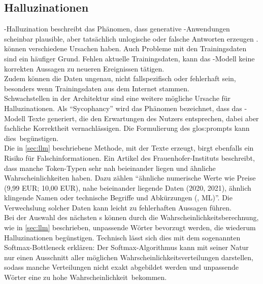 \documentclass[../main.tex]{subfiles}
\begin{document}
\subsection{Halluzinationen}
 -Halluzination beschreibt 
das Phänomen, dass generative -Anwendungen scheinbar plausible, aber tatsächlich unlogische oder falsche Antworten erzeugen \cite{hallucinationForewarning}.\\
 können verschiedene Ursachen haben. Auch Probleme mit den Trainingsdaten sind ein häufiger Grund. Fehlen aktuelle Trainingsdaten, kann das -Modell keine korrekten Aussagen zu neueren Ereignissen tätigen.\\ 
Zudem können die Daten ungenau, nicht fallspezifisch oder fehlerhaft sein, besonders wenn Trainingsdaten aus dem Internet stammen.\\ 
Schwachstellen in der Architektur sind eine weitere mögliche Ursache für Halluzinationen. Als "`Sycophancy"' wird das Phänomen bezeichnet, dass das -Modell Texte 
generiert, die den Erwartungen des Nutzers entsprechen, dabei aber fachliche Korrektheit vernachlässigen. Die Formulierung des \gls{glos:prompt}s kann \mbox{dies begünstigen. \cite{allgemHalluzinationen}} \\
Die in \autoref{sec:llm} beschriebene Methode, mit der  Texte erzeugt, birgt ebenfalls ein Risiko für Falschinformationen. Ein Artikel des Frauenhofer-Instituts beschreibt, dass manche Token-Typen sehr nah beieinander liegen 
und ähnliche Wahrscheinlichkeiten haben. Dazu zählen "`ähnliche numerische Werte wie Preise (9,99 EUR; 10,00 EUR), nahe beieinander liegende Daten (2020, 2021), ähnlich klingende Namen oder 
technische Begriffe und Abkürzungen (, ML)"'\cite{halluzinationenFraunhofer}. Die Verwechslung solcher Daten kann leicht zu fehlerhaften Aussagen führen.\\
Bei der Auswahl des nächsten s können durch die Wahrscheinlichkeitsberechnung, wie in \autoref{sec:llm}  beschrieben, unpassende Wörter bevorzugt werden, die wiederum Halluzinationen 
begünstigen. Technisch lässt sich dies mit dem sogenannten Softmax-Bottleneck erklären: Der Softmax-Algorithmus kann mit seiner Natur nur einen Ausschnitt aller möglichen 
Wahrscheinlichkeitsverteilungen darstellen, sodass manche Verteilungen nicht exakt abgebildet werden und unpassende Wörter eine zu hohe \mbox{Wahrscheinlichkeit bekommen. \cite{softmax}} \\
\end{document}
